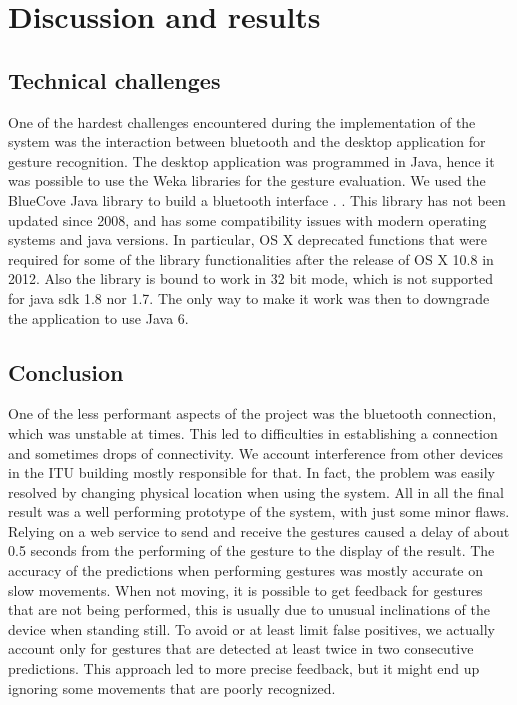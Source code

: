 \section{Discussion and results}

\subsection{Technical challenges}
One of the hardest challenges encountered during the implementation of the system was the interaction between bluetooth and the desktop application for gesture recognition.
The desktop application was programmed in Java, hence it was possible to use the Weka libraries for the gesture evaluation.
We used the BlueCove Java library to build a bluetooth interface \cite{bluecove}. .
This library has not been updated since 2008, and has some compatibility issues with modern operating systems and java versions.
In particular, OS X deprecated functions that were required for some of the library functionalities after the release of OS X 10.8 in 2012.
Also the library is bound to work in 32 bit mode, which is not supported for java sdk 1.8 nor 1.7.
The only way to make it work was then to downgrade the application to use Java 6.

\subsection{Conclusion}

One of the less performant aspects of the project was the bluetooth connection, which was unstable at times. 
This led to difficulties in establishing a connection and sometimes drops of connectivity.
We account interference from other devices in the ITU building mostly responsible for that. 
In fact, the problem was easily resolved by changing physical location when using the system.
All in all the final result was a well performing prototype of the system, with just some minor flaws.
Relying on a web service to send and receive the gestures caused a delay of about 0.5 seconds from the performing of the gesture to the display of the result.
The accuracy of the predictions when performing gestures was mostly accurate on slow movements. When not moving, it is possible to get feedback for gestures that are not being performed, this is usually due to unusual inclinations of the device when standing still.
To avoid or at least limit false positives, we actually account only for gestures that are detected at least twice in two consecutive predictions. 
This approach led to more precise feedback, but it might end up ignoring some movements that are poorly recognized.
